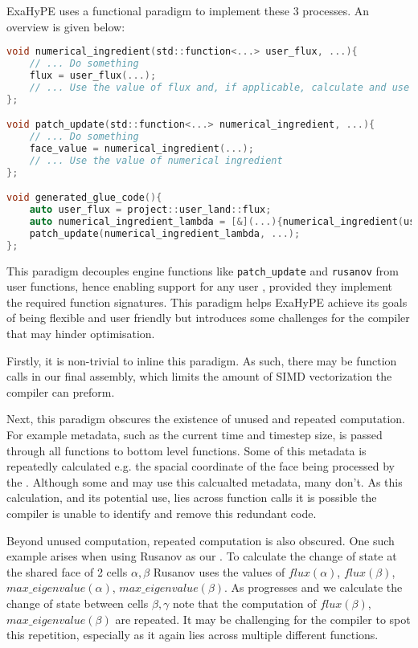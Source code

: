 ExaHyPE uses a functional paradigm to implement these 3 processes.
An overview is given below:
\begin{lstlisting}[language=c]
void numerical_ingredient(std::function<...> user_flux, ...){
    // ... Do something
    flux = user_flux(...);
    // ... Use the value of flux and, if applicable, calculate and use NCP 
};

void patch_update(std::function<...> numerical_ingredient, ...){
    // ... Do something
    face_value = numerical_ingredient(...);
    // ... Use the value of numerical ingredient
};

void generated_glue_code(){
    auto user_flux = project::user_land::flux;
    auto numerical_ingredient_lambda = [&](...){numerical_ingredient(user_flux, ...)};
    patch_update(numerical_ingredient_lambda, ...);
};
\end{lstlisting}
This paradigm decouples engine functions like \lstinline{patch_update} and \lstinline{rusanov} from user functions, hence enabling support for any user , provided they implement the required function signatures.
This paradigm helps ExaHyPE achieve its goals of being flexible and user friendly but introduces some challenges for the compiler that may hinder optimisation.

Firstly, it is non-trivial to inline this paradigm.
As such, there may be function calls in our final assembly, which limits the amount of SIMD vectorization the compiler can preform.

Next, this paradigm obscures the existence of unused and repeated computation.
For example metadata, such as the current time and timestep size, is passed through all functions to bottom level  functions.
Some of this metadata is repeatedly calculated e.g. the spacial coordinate of the face being processed by the .
Although some  and  may use this calcualted metadata, many don't.
As this calculation, and its potential use, lies across function calls it is possible the compiler is unable to identify and remove this redundant code.

Beyond unused computation, repeated computation is also obscured.
One such example arises when using Rusanov as our .
To calculate the change of state at the shared face of 2 cells $\alpha,\beta$ Rusanov uses the values of $flux(\alpha)$, $flux(\beta)$, $max\_eigenvalue(\alpha)$, $max\_eigenvalue(\beta)$.
As  progresses and we calculate the change of state between cells $\beta,\gamma$ note that the computation of $flux(\beta)$, $max\_eigenvalue(\beta)$ are repeated.
It may be challenging for the compiler to spot this repetition, especially as it again lies across multiple different functions.


